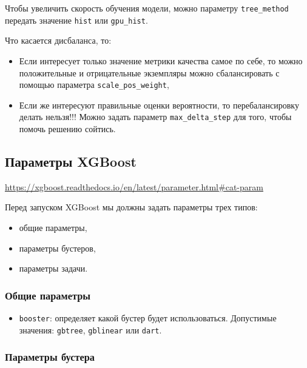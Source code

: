 \documentclass[%
	11pt,
	a4paper,
	utf8,
		]{article}
\begin{document}
Чтобы увеличить скорость обучения модели, можно параметру \verb|tree_method| передать значение \verb|hist| или \verb|gpu_hist|.

Что касается дисбаланса, то:
\begin{itemize}
	\item Если интересует только значение метрики качества самое по себе, то можно положительные и отрицательные экземпляры можно сбалансировать с помощью параметра \verb|scale_pos_weight|,
	
	\item Если же интересуют правильные оценки вероятности, то перебалансировку делать нельзя!!! Можно задать параметр \verb|max_delta_step| для того, чтобы помочь решению сойтись.
\end{itemize}

\subsection{Параметры XGBoost}

\url{https://xgboost.readthedocs.io/en/latest/parameter.html#cat-param}

Перед запуском XGBoost мы должны задать параметры трех типов:
\begin{itemize}
	\item общие параметры,
	
	\item параметры бустеров,
	
	\item параметры задачи.
\end{itemize}

\subsubsection{Общие параметры}

\begin{itemize}
	\item \verb|booster|: определяет какой бустер будет использоваться. Допустимые значения: \verb|gbtree|, \verb|gblinear| или \verb|dart|.
\end{itemize}

\subsubsection{Параметры бустера}
\end{document}
